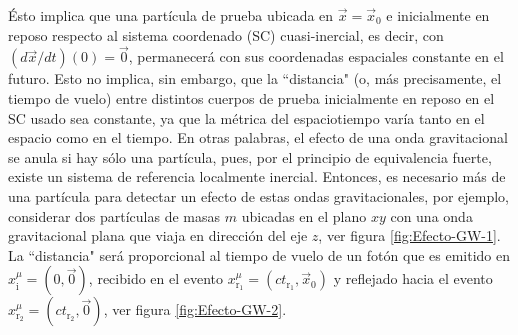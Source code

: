 \documentclass[letterpaper,11pt]{article}
\begin{document}
Ésto implica que una partícula de prueba ubicada en $\vec{x} = \vec{x}_0$ e inicialmente en reposo respecto al sistema coordenado (SC) cuasi-inercial, es decir, con $(d\vec{x}/dt)(0) = \vec{0}$, permanecerá con sus coordenadas espaciales constante en el futuro. Esto no implica, sin embargo, que la ``distancia" (o, más precisamente, el tiempo de vuelo) entre distintos cuerpos de prueba inicialmente en reposo en el SC usado sea constante, ya que la métrica del espaciotiempo varía tanto en el espacio como en el tiempo. En otras palabras, el efecto de una onda gravitacional se anula si hay sólo una partícula, pues, por el principio de equivalencia fuerte, existe un sistema de referencia localmente inercial. Entonces, es necesario más de una partícula para detectar un efecto de estas ondas gravitacionales, por ejemplo, considerar dos partículas de masas $m$ ubicadas en el plano $xy$ con  una onda gravitacional plana que viaja en dirección del eje $z$, ver figura \ref{fig:Efecto-GW-1}. La ``distancia" será proporcional al tiempo de vuelo de un fotón que es emitido en $x^{\mu}_{\text{i}} = (0,\vec{0})$, recibido en el evento $x^{\mu}_{\text{r}_1} = (ct_{\text{r}_1},\vec{x}_0)$ y reflejado hacia el evento $x^{\mu}_{\text{r}_2} = (ct_{\text{r}_2},\vec{0})$, ver figura \ref{fig:Efecto-GW-2}.
\end{document}
